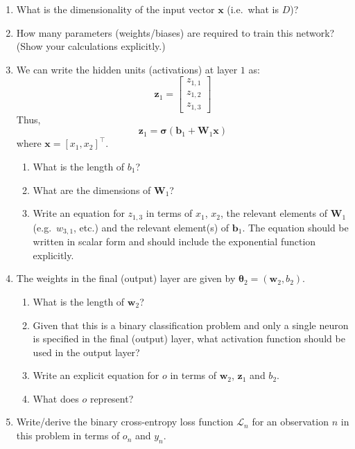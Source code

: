 \documentclass[11pt,twoside]{article}
\newcommand{\pts}[1]{\marginpar{ \small\hspace{0pt} \textit{[#1]} } }
\newcommand{\?}{\stackrel{?}{=}}
\renewcommand{\th}{\theta}
\newcommand{\mc}{\mathcal}
\newcommand{\tr}{^{\bm\top}}
\begin{document}
\begin{enumerate}[\bf (a)]
\item What is the dimensionality of the input vector $\bm x$ (i.e.\ what is $D$)? \pts{1}
\item How many parameters (weights/biases) are required to train this network?\pts{2} (Show your calculations explicitly.)
\item We can write the hidden units (activations) at layer $1$ as:
  \begin{equation}
    \bm z_{1} =
    \begin{bmatrix}
      z_{1,1} \\ z_{1,2} \\  z_{1,3}
    \end{bmatrix}
  \end{equation}
  Thus,
  \begin{equation}
    \bm z_{1} = \bm\sigma(\bm b_{1} + \bm W_{1}\bm x)
  \end{equation}
  where $\bm x = [x_{1}, x_{2}]\tr$.
  \begin{enumerate}[\bf i.]
  \item What is the length of $b_{1}$?\pts{1}
  \item What are the dimensions of $\bm W_{1}$?\pts{1}
  \item Write an equation for $z_{1,3}$ in terms of $x_{1}$, $x_{2}$,\pts{2} the relevant elements of $\bm W_{1}$ (e.g.\ $w_{3,1}$, etc.) and the relevant element(s) of $\bm b_{1}$. The equation should be written in scalar form and should include the exponential function explicitly.
    
  \end{enumerate}
\item The weights in the final (output) layer are given by $\bm\th_{2} = (\bm w_{2}, b_{2})$.
  \begin{enumerate}[\bf i.]
  \item What is the length of $\bm w_{2}$?\pts{1}
  \item Given that this is a binary \pts{1} classification problem and only a single neuron is specified in
    the final (output) layer, what activation function should be used in the output layer?
  \item Write an explicit equation for $o$ \pts{2} in terms of $\bm w_{2}$, $\bm z_{1}$ and $b_{2}$.
  \item What does $o$ represent? \pts{1}
  \end{enumerate}
  \item Write/derive the binary cross-entropy loss function $\mc{L}_n$ for an observation $n$ in this problem \pts{3} in terms of $o_n$ and $y_n$.
\end{enumerate}
\end{document}
